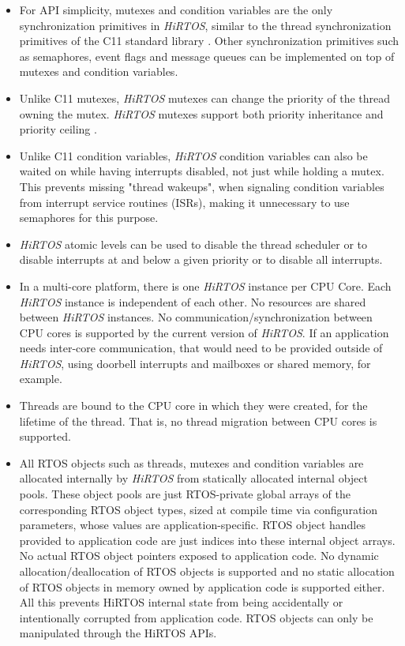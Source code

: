 \documentclass[11pt,letterpaper,twoside,openany]{book}
\begin{document}
\begin{itemize}
\item For API simplicity, mutexes and condition variables \cite{threads1, threads2} are the only
synchronization primitives in \emph{HiRTOS}, similar to the thread synchronization primitives of
the C11 standard library \cite{libcThreads}.
Other synchronization primitives such as semaphores, event flags and message queues can be
implemented on top of mutexes and condition variables.

\item Unlike C11 mutexes, \emph{HiRTOS} mutexes can change the priority of the thread owning the
mutex. \emph{HiRTOS} mutexes support both priority inheritance and priority ceiling \cite{prioCeiling}.

\item Unlike C11 condition variables, \emph{HiRTOS} condition variables
can also be waited on while having interrupts disabled, not just while holding a mutex.
This prevents missing "thread wakeups", when signaling condition variables from interrupt
service routines (ISRs), making it unnecessary to use semaphores for this purpose.

\item \emph{HiRTOS} atomic levels can be used to disable the thread scheduler or to disable interrupts
at and below a given priority or to disable all interrupts.

\item In a multi-core platform, there is one \emph{HiRTOS} instance per CPU Core. Each \emph{HiRTOS}
instance is independent of each other. No resources are shared between \emph{HiRTOS} instances. No
communication/synchronization between CPU cores is supported by the current version of \emph{HiRTOS}.
If an application needs inter-core communication, that would need to be provided outside of
\emph{HiRTOS}, using doorbell interrupts and mailboxes or shared memory, for example.

\item
Threads are bound to the CPU core in which they were created, for the lifetime of the thread. That is,
no thread migration between CPU cores is supported.

\item
All RTOS objects such as threads, mutexes and condition variables are allocated internally
by \emph{HiRTOS} from statically allocated internal object pools.
These object pools are just RTOS-private global arrays of the corresponding RTOS object types,
sized at compile time via configuration parameters, whose values are application-specific.
RTOS object handles provided to application code are just indices into these internal object arrays.
No actual RTOS object pointers exposed to application code. No dynamic allocation/deallocation of
RTOS objects is supported and no static allocation of RTOS objects in memory owned by application
code is supported either. All this prevents HiRTOS internal state from being accidentally or
intentionally corrupted from application code. RTOS objects can only be manipulated through the
HiRTOS APIs.


\end{itemize}
\end{document}
